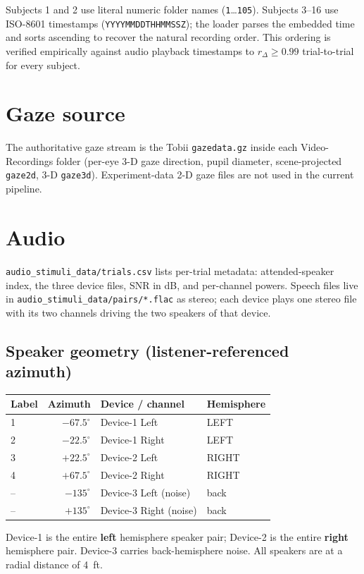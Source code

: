 \documentclass[11pt]{report}
\newcommand{\code}[1]{\texttt{\small #1}}
\begin{document}
Subjects 1 and 2 use literal numeric folder names (\code{1}\ldots\code{105}).
Subjects 3--16 use ISO-8601 timestamps (\code{YYYYMMDDTHHMMSSZ}); the loader
parses the embedded time and sorts ascending to recover the natural recording
order. This ordering is verified empirically against audio playback
timestamps to $r_\Delta \geq 0.99$ trial-to-trial for every subject.

\section*{Gaze source}
The authoritative gaze stream is the Tobii \code{gazedata.gz} inside each
Video-Recordings folder (per-eye 3-D gaze direction, pupil diameter,
scene-projected \code{gaze2d}, 3-D \code{gaze3d}). Experiment-data 2-D gaze
files are not used in the current pipeline.

\section*{Audio}
\code{audio\_stimuli\_data/trials.csv} lists per-trial metadata:
attended-speaker index, the three device files, SNR in dB, and per-channel
powers. Speech files live in \code{audio\_stimuli\_data/pairs/*.flac} as
stereo; each device plays one stereo file with its two channels driving
the two speakers of that device.

\subsection*{Speaker geometry (listener-referenced azimuth)}
\begin{center}
\begin{tabular}{lrll}
\toprule
Label & Azimuth & Device / channel & Hemisphere \\
\midrule
1 & $-67.5^\circ$ & Device-1 Left  & LEFT \\
2 & $-22.5^\circ$ & Device-1 Right & LEFT \\
3 & $+22.5^\circ$ & Device-2 Left  & RIGHT \\
4 & $+67.5^\circ$ & Device-2 Right & RIGHT \\
-- & $-135^\circ$ & Device-3 Left  (noise) & back \\
-- & $+135^\circ$ & Device-3 Right (noise) & back \\
\bottomrule
\end{tabular}
\end{center}

Device-1 is the entire \textbf{left} hemisphere speaker pair; Device-2 is
the entire \textbf{right} hemisphere pair. Device-3 carries back-hemisphere
noise. All speakers are at a radial distance of \SI{4}{ft}.


















\end{document}
